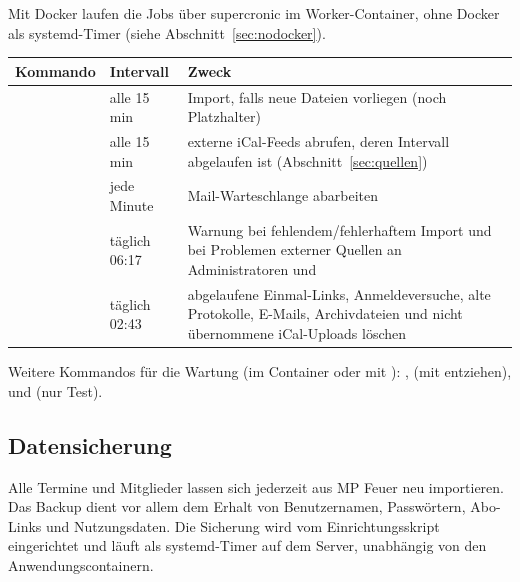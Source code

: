 Mit Docker laufen die Jobs über supercronic im Worker-Container, ohne Docker
als systemd-Timer (siehe Abschnitt~\ref{sec:nodocker}).

\begin{center}
\begin{tabularx}{\textwidth}{L{4.6cm}L{3.0cm}X}
\toprule
\textbf{Kommando} & \textbf{Intervall} & \textbf{Zweck} \\
\midrule
{} & alle 15 min & Import, falls neue Dateien vorliegen
  (noch Platzhalter) \\
 & alle 15 min & externe iCal-Feeds abrufen, deren
  Intervall abgelaufen ist (Abschnitt~\ref{sec:quellen}) \\
 & jede Minute & Mail-Warteschlange abarbeiten \\
 & täglich 06:17 & Warnung bei fehlendem/fehlerhaftem
  Import und bei Problemen externer Quellen an Administratoren und
   \\
 & täglich 02:43 & abgelaufene Einmal-Links,
  Anmeldeversuche, alte Protokolle, E-Mails, Archivdateien und nicht
  übernommene iCal-Uploads löschen \\
\bottomrule
\end{tabularx}
\end{center}

Weitere Kommandos für die Wartung (im Container  oder
 mit ):
,  (mit 
entziehen),  und  (nur Test).

\subsection{Datensicherung}

Alle Termine und Mitglieder lassen sich jederzeit aus MP Feuer neu
importieren. Das Backup dient vor allem dem Erhalt von Benutzernamen,
Passwörtern, Abo-Links und Nutzungsdaten. Die Sicherung wird vom
Einrichtungsskript  eingerichtet und läuft
als systemd-Timer auf dem Server, unabhängig von den Anwendungscontainern.

